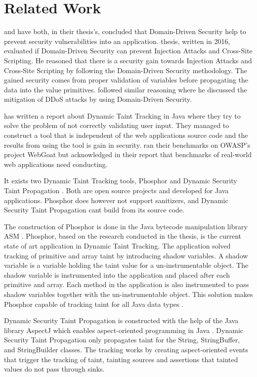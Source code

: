 \chapter{Related Work}
\textcite{Stendahl2016} and \textcite{Arnor2016} have both, in their thesis's, concluded that Domain-Driven Security help to prevent security vulnerabilities into an application. \textcite{Stendahl2016} thesis, written in 2016, evaluated if Domain-Driven Security can prevent Injection Attacks and Cross-Site Scripting. He reasoned that there is a security gain towards Injection Attacks and Cross-Site Scripting by following the Domain-Driven Security methodology. The gained security comes from proper validation of variables before propagating the data into the value primitives. \textcite{Arnor2016} followed similar reasoning where he discussed the mitigation of DDoS attacks by using Domain-Driven Security.

\textcite{Haldar} has written a report about Dynamic Taint Tracking in Java where they try to solve the problem of not correctly validating user input. They managed to construct a tool that is independent of the web applications source code and the results from using the tool is gain in security. \textcite{Haldar} ran their benchmarks on OWASP’s project WebGoat \parencite{webgoat} but acknowledged in their report that benchmarks of real-world web applications need conducting.

It exists two Dynamic Taint Tracking tools, Phosphor \parencite{phosphor} and Dynamic Security Taint Propagation \parencite{securityTaint}. Both are open source projects and developed for Java applications. Phosphor does however not support sanitizers, and Dynamic Security Taint Propagation cant build from its source code.

The construction of Phosphor \parencite{phosphor} is done in the Java bytecode manipulation library ASM \parencite{asm}. Phosphor, based on the research conducted in the thesis, is the current state of art application in Dynamic Taint Tracking. The application solved tracking of primitive and array taint by introducing shadow variables. A shadow variable is a variable holding the taint value for a un-instrumentable object. The shadow variable is instrumented into the application and placed after each primitive and array. Each method in the application is also instrumented to pass shadow variables together with the un-instrumentable object. This solution makes Phosphor capable of tracking taint for all Java data types \parencite{BellJ.2014PIdd}.

Dynamic Security Taint Propagation \parencite{securityTaint} is constructed with the help of the Java library AspectJ which enables aspect-oriented programming in Java \parencite{aspectj}. Dynamic Security Taint Propagation only propagates taint for the String, StringBuffer, and StringBuilder classes. The tracking works by creating aspect-oriented events that trigger the tracking of taint, tainting sources and assertions that tainted values do not pass through sinks.